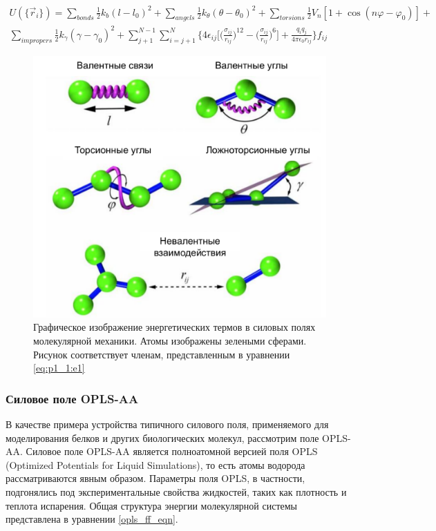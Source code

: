 \begin{multline}
    U(\{\vec{r}_i\})= \sum_{bonds} \frac{1}{2} k_b (l-l_0)^2  + \sum_{angels} \frac{1}{2}k_\theta (\theta - \theta_0)^2 + \sum_{torsions} \frac{1}{2} V_n [1+\cos({n\varphi-\varphi_0})] + \\
     \sum_{impropers} \frac{1}{2} k_\gamma (\gamma-\gamma_0)^2 + \sum_{j+1}^{N-1} \sum_{i=j+1}^{N} \Bigg\{ 4\epsilon_{ij} \Bigg[\Big(\frac{\sigma_{ij}}{r_{ij}}\Big)^{12} - \Big(\frac{\sigma_{ij}}{r_{ij}}\Big)^6\Bigg] + \frac{q_iq_j}{4\pi \epsilon_0 r_{ij}} \Bigg\} f_{ij}
     \label{eq:p1_1:e1}
\end{multline}

\begin{figure} [h!]
    \centering
    \includegraphics [width=\textwidth]{images/p1/part1_1_md/part1_1_md_f10.pdf}
    \caption[Энергетические термы силового поля]{Графическое изображение энергетических термов в силовых полях молекулярной механики. Атомы изображены зелеными сферами. Рисунок соответствует членам, представленным в уравнении 
    \ref{eq:p1_1:e1}}
    \label{fig:p1_1:f10}
\end{figure}


\subsubsection{Силовое поле OPLS-AA}
В качестве примера устройства типичного силового поля, применяемого для моделирования белков и других биологических молекул, рассмотрим поле OPLS-AA. Силовое поле OPLS-AA \cite{oplsaa,oplsaa2} является полноатомной версией поля OPLS (Optimized Potentials for Liquid Simulations), то есть атомы водорода рассматриваются явным образом. Параметры поля OPLS, в частности, подгонялись под экспериментальные свойства жидкостей, таких как плотность и теплота испарения.
Общая структура энергии молекулярной системы представлена в уравнении \ref{opls_ff_eqn}.

